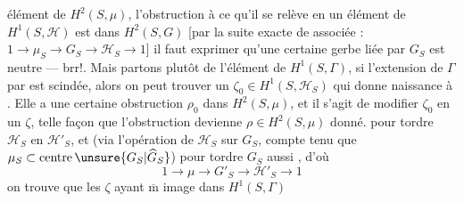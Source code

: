 élément de $H^2(S,\mu)$, l'obstruction à ce qu'il
se relève en un élément \inserted{$\zeta$} de $H^1(S,\mathcal H)$ est
dans $H^2(S,G)$ [par la suite exacte
de  associée : $1\longrightarrow\mu_S\longrightarrow G_S\longrightarrow\mathcal H_S\longrightarrow1$]
il faut exprimer qu'une certaine  gerbe
liée par $G_S$ est neutre --- brr!. Mais
partons plutôt de l'élément \unsure{$\omega$|$\widetilde\zeta$} de $H^1(S,\Gamma)$,
si l'extension de $\Gamma$ par  est scindée, alors
on peut trouver un $\zeta_0\in H^1(S,\mathcal H_S)$ qui
donne naissance à \unsure{$\omega$}. Elle a une certaine
obstruction $\rho_0$ dans $H^2(S,\mu)$, et il s'agit
de modifier $\zeta_0$ en un $\zeta$,  telle façon que
l'obstruction devienne $\rho\in H^2(S,\mu)$ donné.
  pour tordre $\mathcal H_S$ en
$\mathcal H'_S$, et (via l'opération de $\mathcal H_S$  sur $G_S$,
compte tenu que $\mu_S\subset\mathrm{centre}\,\unsure{G_S|\widehat G_S}$) pour
tordre $G_S$ aussi , d'où
\[
1\longrightarrow\mu\longrightarrow G'_S\longrightarrow\mathcal H'_S\longrightarrow1
\]
on trouve que les $\zeta$ ayant $\overline{\mathrm m}$ image dans $H^1(S,\Gamma)$

